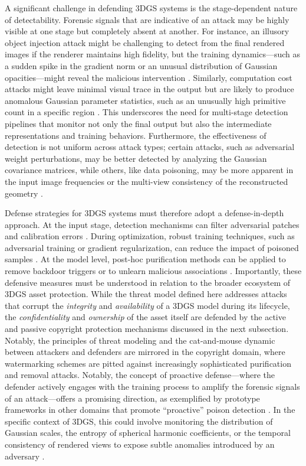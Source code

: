 \documentclass[11pt]{article}
\begin{document}
A significant challenge in defending 3DGS systems is the stage-dependent nature of detectability. Forensic signals that are indicative of an attack may be highly visible at one stage but completely absent at another. For instance, an illusory object injection attack might be challenging to detect from the final rendered images if the renderer maintains high fidelity, but the training dynamics---such as a sudden spike in the gradient norm or an unusual distribution of Gaussian opacities---might reveal the malicious intervention \cite{ref712}. Similarly, computation cost attacks might leave minimal visual trace in the output but are likely to produce anomalous Gaussian parameter statistics, such as an unusually high primitive count in a specific region \cite{ref717}. This underscores the need for multi-stage detection pipelines that monitor not only the final output but also the intermediate representations and training behaviors. Furthermore, the effectiveness of detection is not uniform across attack types; certain attacks, such as adversarial weight perturbations, may be better detected by analyzing the Gaussian covariance matrices, while others, like data poisoning, may be more apparent in the input image frequencies or the multi-view consistency of the reconstructed geometry \cite{ref712}.

Defense strategies for 3DGS systems must therefore adopt a defense-in-depth approach. At the input stage, detection mechanisms can filter adversarial patches and calibration errors \cite{ref717}. During optimization, robust training techniques, such as adversarial training or gradient regularization, can reduce the impact of poisoned samples \cite{ref718}. At the model level, post-hoc purification methods can be applied to remove backdoor triggers or to unlearn malicious associations \cite{ref719,ref720}. Importantly, these defensive measures must be understood in relation to the broader ecosystem of 3DGS asset protection. While the threat model defined here addresses attacks that corrupt the \emph{integrity} and \emph{availability} of a 3DGS model during its lifecycle, the \emph{confidentiality} and \emph{ownership} of the asset itself are defended by the active and passive copyright protection mechanisms discussed in the next subsection. Notably, the principles of threat modeling and the cat-and-mouse dynamic between attackers and defenders are mirrored in the copyright domain, where watermarking schemes are pitted against increasingly sophisticated purification and removal attacks. Notably, the concept of proactive defense---where the defender actively engages with the training process to amplify the forensic signals of an attack---offers a promising direction, as exemplified by prototype frameworks in other domains that promote ``proactive'' poison detection \cite{ref721}. In the specific context of 3DGS, this could involve monitoring the distribution of Gaussian scales, the entropy of spherical harmonic coefficients, or the temporal consistency of rendered views to expose subtle anomalies introduced by an adversary \cite{ref712}.
\end{document}
